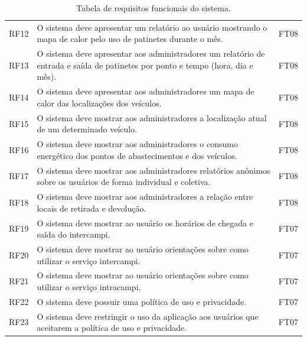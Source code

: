 \begin{table}[htbp]
\begin{tabular}{lp{}r}
        RF12       & O sistema deve apresentar um relatório ao usuário mostrando o mapa de calor pelo uso de patinetes durante o mês.                & FT08       \\
        RF13       & O sistema deve apresentar aos administradores um relatório de entrada e saída de patinetes por ponto e tempo (hora, dia e mês). & FT08       \\
        RF14       & O sistema deve apresentar aos administradores um mapa de calor das localizações dos veículos.                                   & FT08       \\
        RF15       & O sistema deve mostrar aos administradores a localização atual de um determinado veículo.                                       & FT08       \\
        RF16       & O sistema deve mostrar aos administradores o consumo energético dos pontos de abastecimentos e dos veículos.                    & FT08       \\
        RF17       & O sistema deve mostrar aos administradores relatórios anônimos sobre os usuários de forma individual e coletiva.                & FT08       \\
        RF18       & O sistema deve mostrar aos administradores a relação entre locais de retirada e devolução.                                      & FT08       \\
        RF19       & O sistema deve mostrar ao usuário os horários de chegada e saída do intercampi.                                                 & FT07       \\
        RF20       & O sistema deve mostrar ao usuário orientações sobre como utilizar o serviço intercampi.                                         & FT07       \\
        RF21       & O sistema deve mostrar ao usuário orientações sobre como utilizar o serviço intracampi.                                         & FT07       \\
        RF22       & O sistema deve possuir uma política de uso e privacidade.                                                                       & FT07       \\
        RF23       & O sistema deve restringir o uso da aplicação aos usuários que aceitarem a política de uso e privacidade.                        & FT07       \\
        \bottomrule
    \end{tabular}
    \caption{Tabela de requisitos funcionais do sistema.}
    \label{tab:reqFunSistema}
\end{table}

